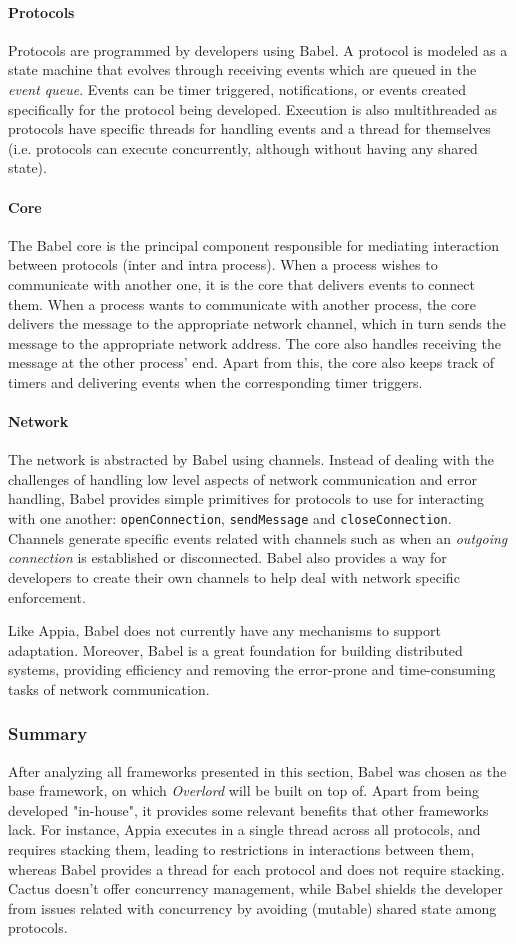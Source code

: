 \paragraph{Protocols} Protocols are programmed by developers using Babel. A protocol is modeled as a state machine that evolves through receiving events which are queued in the \textit{event queue}. Events can be timer triggered, notifications, or events created specifically for the protocol being developed. Execution is also multithreaded as protocols have specific threads for handling events and a thread for themselves (i.e. protocols can execute concurrently, although without having any shared state).
\paragraph{Core} The Babel core is the principal component responsible for mediating interaction between protocols (inter and intra process). When a process wishes to communicate with another one, it is the core that delivers events to connect them. When a process wants to communicate with another process, the core delivers the message to the appropriate network channel, which in turn sends the message to the appropriate network address. The core also handles receiving the message at the other process' end. Apart from this, the core also keeps track of timers and delivering events when the corresponding timer triggers.
\paragraph{Network} The network is abstracted by Babel using channels. Instead of dealing with the challenges of handling low level aspects of network communication and error handling, Babel provides simple primitives for protocols to use for interacting with one another: \texttt{openConnection}, \texttt{sendMessage} and \texttt{closeConnection}. Channels generate specific events related with channels such as when an \textit{outgoing connection} is established or disconnected. Babel also provides a way for developers to create their own channels to help deal with network specific enforcement.
\par Like Appia, Babel does not currently have any mechanisms to support adaptation. Moreover, Babel is a great foundation for building distributed systems, providing efficiency and removing the error-prone and time-consuming tasks of network communication.
\subsubsection{Summary} After analyzing all frameworks presented in this section, Babel was chosen as the base framework, on which \textit{Overlord} will be built on top of. Apart from being developed "in-house", it provides some relevant benefits that other frameworks lack. For instance, Appia executes in a single thread across all protocols, and requires stacking them, leading to restrictions in interactions between them, whereas Babel provides a thread for each protocol and does not require stacking. Cactus doesn't offer concurrency management, while Babel shields the developer from issues related with concurrency by avoiding (mutable) shared state among protocols.